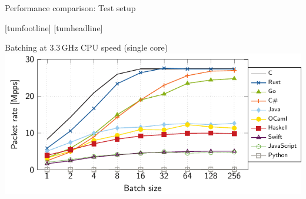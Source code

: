 \documentclass[NET,english,aspectratio=169,notitleframe]{tumbeamer}
\begin{document}
\begin{frame}{Performance comparison: Test setup}
\centering
\end{frame}
[tumfootline]
[tumheadline]



\begin{frame}{Batching at 3.3\,GHz CPU speed (single core)}
\centering\includegraphics[scale=1]{figures/batches-33.pdf}
\end{frame}
\end{document}
